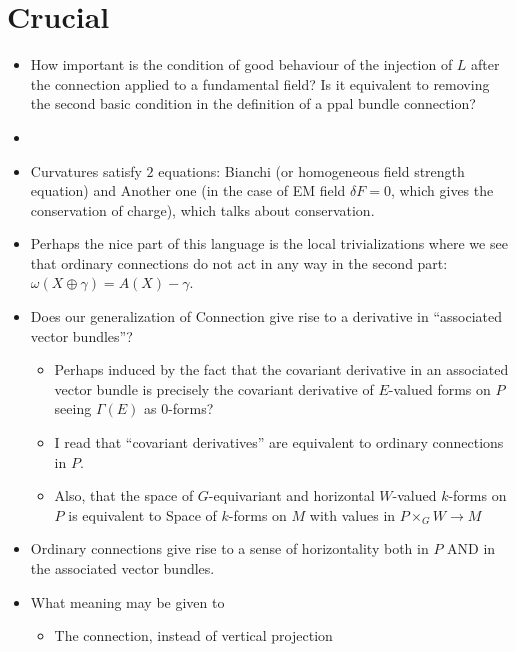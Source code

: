 \section{Crucial}
\begin{itemize}
    \item How important is the condition of good behaviour of the injection of $L$ after the connection applied to a fundamental field? Is it equivalent to removing the second basic condition in the definition of a ppal bundle connection?
    
    \item {}
    
    \item Curvatures satisfy $2$ equations: Bianchi (or homogeneous field strength equation) and Another one (in the case of EM field $\delta F = 0$, which gives the conservation of charge), which talks about conservation.
    
    \item Perhaps the nice part of this language is the local trivializations where we see that ordinary connections do not act in any way in the second part: $\omega(X \oplus \gamma) = A(X) - \gamma$.
    
    \item Does our generalization of Connection give rise to a  derivative in ``associated vector bundles''?
    \begin{itemize}
        \item Perhaps induced by the fact that the covariant derivative in an associated vector bundle is precisely the covariant derivative of $E$-valued forms on $P$ seeing $\Gamma(E)$ as $0$-forms?
        
        \item I read that ``covariant derivatives'' are equivalent to ordinary connections in $P$.
        
        \item Also, that the space of $G$-equivariant and horizontal $W$-valued $k$-forms on $P$ is equivalent to Space of $k$-forms on $M$ with values in $P\times_G W \to M$
    \end{itemize}
    
    
    \item Ordinary connections give rise to a sense of horizontality both in $P$ AND in the associated vector bundles.
    
    \item What meaning may be given to
    \begin{itemize}
        \item The connection, instead of vertical projection
        

\end{itemize}
\end{itemize}
